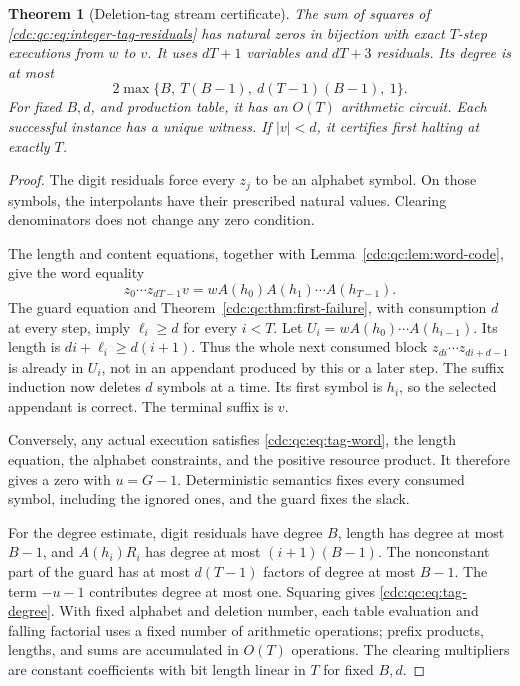 \documentclass[11pt,a4paper]{article}
\newtheorem{theorem}{Theorem}[section]
\theoremstyle{definition}
\theoremstyle{remark}
\begin{document}
\begin{theorem}[Deletion-tag stream certificate]\label{cdc:qc:thm:tag}
The sum of squares of \eqref{cdc:qc:eq:integer-tag-residuals} has natural zeros in bijection with exact $T$-step executions from $w$ to $v$. It uses $dT+1$ variables and $dT+3$ residuals. Its degree is at most
\begin{equation}\label{cdc:qc:eq:tag-degree}
 2\max\{B,\ T(B-1),\ d(T-1)(B-1),\ 1\}.
\end{equation}
For fixed $B,d$, and production table, it has an $O(T)$ arithmetic circuit. Each successful instance has a unique witness. If $|v|<d$, it certifies first halting at exactly $T$.
\end{theorem}
\begin{proof}
The digit residuals force every $z_j$ to be an alphabet symbol. On those symbols, the interpolants have their prescribed natural values. Clearing denominators does not change any zero condition.

The length and content equations, together with Lemma~\ref{cdc:qc:lem:word-code}, give the word equality
\begin{equation}\label{cdc:qc:eq:tag-word}
 z_0\cdots z_{dT-1}v=wA(h_0)A(h_1)\cdots A(h_{T-1}).
\end{equation}
The guard equation and Theorem~\ref{cdc:qc:thm:first-failure}, with consumption $d$ at every step, imply $\ell_i\geq d$ for every $i<T$. Let $U_i=wA(h_0)\cdots A(h_{i-1})$. Its length is $di+\ell_i\geq d(i+1)$. Thus the whole next consumed block $z_{di}\cdots z_{di+d-1}$ is already in $U_i$, not in an appendant produced by this or a later step. The suffix induction now deletes $d$ symbols at a time. Its first symbol is $h_i$, so the selected appendant is correct. The terminal suffix is $v$.

Conversely, any actual execution satisfies \eqref{cdc:qc:eq:tag-word}, the length equation, the alphabet constraints, and the positive resource product. It therefore gives a zero with $u=G-1$. Deterministic semantics fixes every consumed symbol, including the ignored ones, and the guard fixes the slack.

For the degree estimate, digit residuals have degree $B$, length has degree at most $B-1$, and $A(h_i)R_i$ has degree at most $(i+1)(B-1)$. The nonconstant part of the guard has at most $d(T-1)$ factors of degree at most $B-1$. The term $-u-1$ contributes degree at most one. Squaring gives \eqref{cdc:qc:eq:tag-degree}. With fixed alphabet and deletion number, each table evaluation and falling factorial uses a fixed number of arithmetic operations; prefix products, lengths, and sums are accumulated in $O(T)$ operations. The clearing multipliers are constant coefficients with bit length linear in $T$ for fixed $B,d$.
\end{proof}
\end{document}
